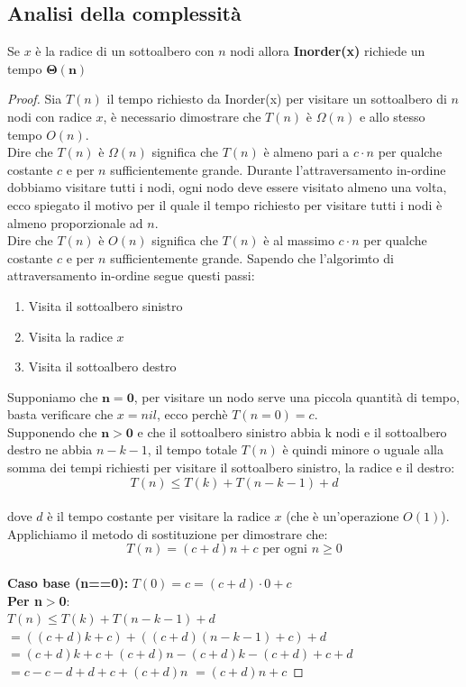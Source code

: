 \subsection{Analisi della complessità}
\colorbox{SALZO}{\parbox{\dimexpr\linewidth-2\fboxsep}{\begin{theorem}
Se $x$ è la radice di un sottoalbero con $n$ nodi allora \textbf{Inorder(x)} richiede un tempo $\mathbf{\Theta(n)}$
\end{theorem}}}
\begin{proof}
Sia $T(n)$ il tempo richiesto da Inorder(x) per visitare un sottoalbero di $n$ nodi con radice $x$, è necessario dimostrare che $T(n)$ è $\Omega(n)$ e allo stesso tempo $O(n)$.\\
Dire che $T(n)$ è $\Omega(n)$ significa che $T(n)$ è almeno pari a $c \cdot n$ per qualche costante $c$ e per $n$ 
sufficientemente grande. Durante l'attraversamento in-ordine dobbiamo visitare tutti i nodi, ogni nodo deve essere 
visitato almeno una volta, ecco spiegato il motivo per il quale il tempo richiesto per visitare tutti i nodi è almeno proporzionale ad $n$.\\
Dire che $T(n)$ è $O(n)$ significa che $T(n)$ è al massimo $c \cdot n$ per qualche costante $c$ e per $n$ sufficientemente grande. Sapendo che l'algorimto 
di attraversamento in-ordine segue questi passi:
\begin{enumerate}
    \item Visita il sottoalbero sinistro
    \item Visita la radice $x$
    \item Visita il sottoalbero destro
\end{enumerate}
\noindent Supponiamo che $\mathbf{n=0}$, per visitare un nodo serve una piccola quantità di tempo, basta verificare che $x=nil$, ecco perchè $T(n=0)=c$.\\
Supponendo che $\mathbf{n>0}$ e che il sottoalbero sinistro abbia k nodi e il sottoalbero destro ne abbia $n-k-1$, il tempo totale $T(n)$ è quindi minore o uguale alla somma 
dei tempi richiesti per visitare il sottoalbero sinistro, la radice e il destro:\\
$$T(n) \le T(k) + T(n-k-1)+d $$\\
dove $d$ è il tempo costante per visitare la radice $x$ (che è un'operazione $O(1)$). Applichiamo il metodo di sostituzione per dimostrare che:\\
$$T(n)=(c+d)n+c \text{ per ogni } n \ge 0$$\\
\textbf{Caso base (n==0):} $T(0)=c=(c+d) \cdot 0 + c$\\
\textbf{Per n$>$0}:\\
$T(n) \le T(k) + T(n-k-1)+d$\\
$=((c+d)k+c)+((c+d)(n-k-1)+c)+d$\\
$=(c+ d)k+ c+ (c+ d)n-(c+ d)k-(c+ d) + c+ d$\\
$= c-c-d+ d+ c+ (c+ d)n$ 
$= (c+ d)n+ c$
\end{proof}
